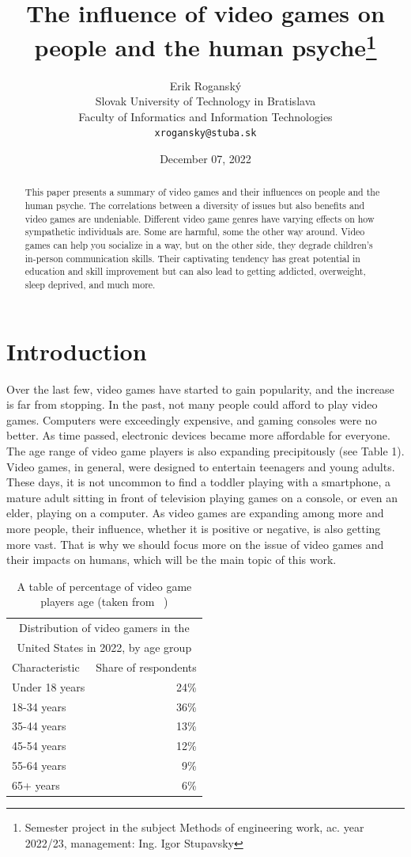 \documentclass[10pt,twoside,english,a4paper]{article}
\title{The influence of video games on people and the human psyche\thanks{Semester project in the subject Methods of engineering work, ac. year 2022/23, management: Ing. Igor Stupavsky}}
\author{Erik Roganský\\[2pt]
	{\small Slovak University of Technology in Bratislava}\\
	{\small Faculty of Informatics and Information Technologies}\\
	{\small \texttt{xrogansky@stuba.sk}}
	}
\date{\small December 07, 2022}
\begin{document}
\maketitle

\begin{abstract}
This paper presents a summary of video games and their influences on people and the human psyche. The correlations between a diversity of issues but also benefits and video games are undeniable. Different video game genres have varying effects on how sympathetic individuals are. Some are harmful, some the other way around. Video games can help you socialize in a way, but on the other side, they degrade children's in-person communication skills. Their captivating tendency has great potential in education and skill improvement but can also lead to getting addicted, overweight, sleep deprived, and much more.
\end{abstract}



\section{Introduction}
Over the last few, video games have started to gain popularity, and the increase is far from stopping. In the past, not many people could afford to play video games. Computers were exceedingly expensive, and gaming consoles were no better. As time passed, electronic devices became more affordable for everyone. The age range of video game players is also expanding precipitously (see Table 1). Video games, in general, were designed to entertain teenagers and young adults. These days, it is not uncommon to find a toddler playing with a smartphone, a mature adult sitting in front of television playing games on a console, or even an elder, playing on a computer. As video games are expanding among more and more people, their influence, whether it is positive or negative, is also getting more vast. That is why we should focus more on the issue of video games and their impacts on humans, which will be the main topic of this work.

\begin{table}[h]
\centering
\begin{tabular}{ |p{3cm} r| }
 \hline
 \multicolumn{2}{|c|}{Distribution of video gamers in the} \\
 \multicolumn{2}{|c|}{United States in 2022, by age group} \\
 \hline
 Characteristic & Share of respondents\\
 \hline
 Under 18 years & 24\%\\
 18-34 years & 36\%\\
 35-44 years & 13\%\\
 45-54 years & 12\%\\
 55-64 years & 9\%\\
 65+ years & 6\%\\
 \hline
\end{tabular}
\caption{A table of percentage of video game players age (taken from ~\cite{age2022})}
\end{table}
\end{document}
